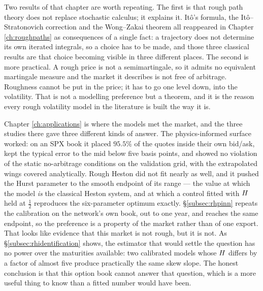 
Two results of that chapter are worth repeating. The first is that rough path theory does not
replace stochastic calculus; it explains it. It\^o's formula, the It\^o--Stratonovich correction and
the Wong--Zakai theorem all reappeared in Chapter \ref{ch:roughpaths} as consequences of a single
fact: a trajectory does not determine its own iterated integrals, so a choice has to be made, and
those three classical results are that choice becoming visible in three different places. The second
is more practical. A rough price is not a semimartingale, so it admits no equivalent martingale
measure and the market it describes is not free of arbitrage. Roughness cannot be put in the price;
it has to go one level down, into the volatility. That is not a modelling preference but a theorem,
and it is the reason every rough volatility model in the literature is built the way it is.

Chapter \ref{ch:applications} is where the models met the market, and the three studies there gave
three different kinds of answer. The physics-informed surface worked: on an SPX book it placed
$95.5\%$ of the quotes inside their own bid/ask, kept the typical error to the mid below five basis
points, and showed no violation of the static no-arbitrage conditions on the validation grid, with
the extrapolated wings covered analytically. Rough Heston did not
fit nearly as well, and it pushed the Hurst parameter to the smooth endpoint of its range --- the
value at which the model \emph{is} the classical Heston system, and at which a control fitted with
$H$ held at $\tfrac12$ reproduces the six-parameter optimum exactly.
\S\ref{subsec:rhpinn} repeats the calibration on the network's own book, out to one year, and
reaches the same endpoint, so the preference is a property of the market rather than of one
export. That looks like evidence that this market is not rough, but it is not. As \S\ref{subsec:rhidentification} shows, the
estimator that would settle the question has no power over the maturities available: two calibrated
models whose $H$ differs by a factor of almost five produce practically the same skew slope.
The honest conclusion is that this option book cannot answer that question, which is a more useful
thing to know than a fitted number would have been.


